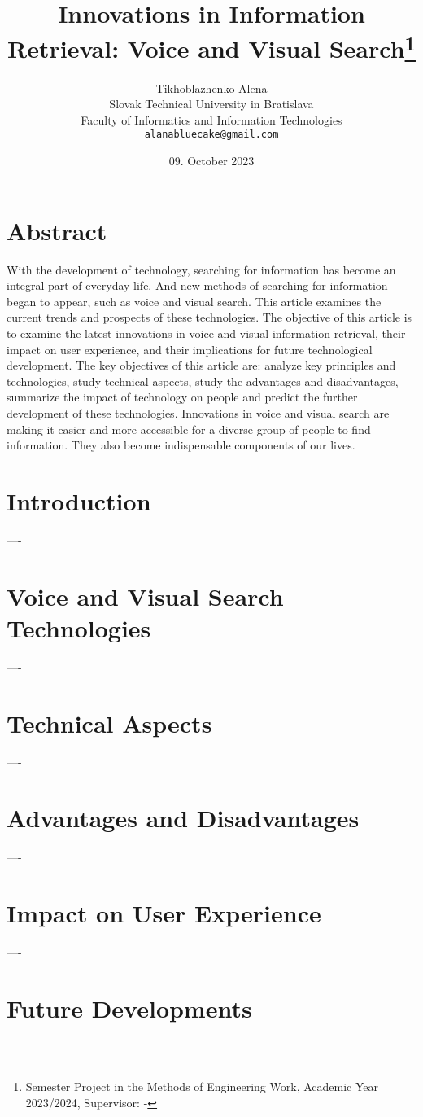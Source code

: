 \documentclass[10pt]{article}
\title{ Innovations in Information Retrieval: Voice and Visual Search\thanks{Semester Project in the Methods of Engineering Work, Academic Year 2023/2024, Supervisor: - }}
\author{Tikhoblazhenko Alena\\[2pt]
	{\small Slovak Technical University in Bratislava}\\
	{\small Faculty of Informatics and Information Technologies}\\
	{\small \texttt{alanabluecake@gmail.com}}
	}
\date{09. October 2023}
\begin{document}
\maketitle

\section*{Abstract}
With the development of technology, searching for information has become an integral part of everyday life. And new methods of searching for information began to appear, such as voice and visual search. This article examines the current trends and prospects of these technologies. The objective of this article is to examine the latest innovations in voice and visual information retrieval, their impact on user experience, and their implications for future technological development. The key objectives of this article are: analyze key principles and technologies, study technical aspects, study the advantages and disadvantages, summarize the impact of technology on people and predict the further development of these technologies. Innovations in voice and visual search are making it easier and more accessible for a diverse group of people to find information. They also become indispensable components of our lives.

\section{Introduction}
----

\section{Voice and Visual Search Technologies}
----

\section{Technical Aspects}
----

\section{Advantages and Disadvantages}
----

\section{Impact on User Experience}
----

\section{Future Developments}
----

\printbibliography[title={Literature}]
\end{document}

